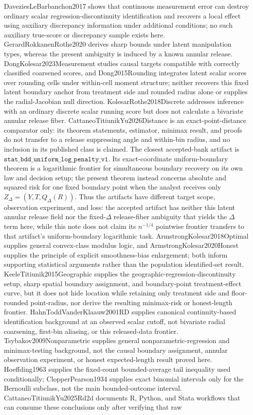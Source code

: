 \documentclass{article}
\begin{document}
DaveziesLeBarbanchon2017 shows that continuous measurement error can destroy ordinary scalar regression-discontinuity identification and recovers a local effect using auxiliary discrepancy information under additional conditions; no such auxiliary true-score or discrepancy sample exists here.  GerardRokkanenRothe2020 derives sharp bounds under latent manipulation types, whereas the present ambiguity is induced by a known annular release.  DongKolesar2023Measurement studies causal targets compatible with correctly classified coarsened scores, and Dong2015Rounding integrates latent scalar scores over rounding cells under within-cell moment structure; neither recovers this fixed latent boundary anchor from treatment side and rounded radius alone or supplies the radial-Jacobian null direction.  KolesarRothe2018Discrete addresses inference with an ordinary discrete scalar running score but does not calculate a bivariate annular release fiber.  CattaneoTitiunikYu2026Distance is an exact-point-distance comparator only: its theorem statements, estimator, minimax result, and proofs do not transfer to a release suppressing angle and within-bin radius, and no inclusion in its published class is claimed.  The closest accepted-bank artifact is \(\texttt{stat\_bdd\_uniform\_log\_penalty\_v1}\). Its exact-coordinate uniform-boundary theorem is a logarithmic frontier for simultaneous boundary recovery on its own law and decision setup; the present theorem instead concerns absolute and squared risk for one fixed boundary point when the analyst receives only \(Z_\Delta=(Y,T,Q_\Delta(R))\). Thus the artifacts have different target scope, observation experiment, and loss: the accepted artifact has neither this latent annular release field nor the fixed-\(\Delta\) release-fiber ambiguity that yields the \(\Delta\) term here, while this note does not claim its \(n^{-1/4}\) pointwise frontier transfers to that artifact's uniform-boundary logarithmic task.  ArmstrongKolesar2018Optimal supplies general convex-class modulus logic, and ArmstrongKolesar2020Honest supplies the principle of explicit smoothness-bias enlargement; both inform supporting statistical arguments rather than the population identified-set result.  KeeleTitiunik2015Geographic supplies the geographic-regression-discontinuity setup, sharp spatial boundary assignment, and boundary-point treatment-effect curve, but it does not hide location while retaining only treatment side and floor-rounded point-radius, nor derive the resulting minimax-risk or honest-length frontier.  HahnToddVanderKlaauw2001RD supplies canonical continuity-based identification background at an observed scalar cutoff, not bivariate radial coarsening, first-bin aliasing, or this released-data frontier.  Tsybakov2009Nonparametric supplies general nonparametric-regression and minimax-testing background, not the causal boundary assignment, annular observation experiment, or honest expected-length result proved here.  Hoeffding1963 supplies the fixed-count bounded-average tail inequality used conditionally; ClopperPearson1934 supplies exact binomial intervals only for the Bernoulli subclass, not the main bounded-outcome interval.  CattaneoTitiunikYu2025Rd2d documents R, Python, and Stata workflows that can consume these conclusions only after verifying that raw 
\end{document}
